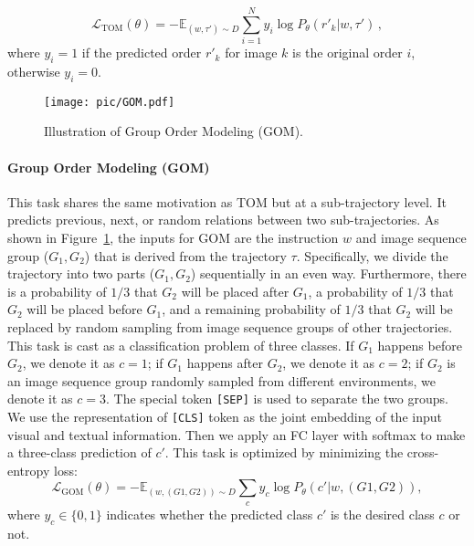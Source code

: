 \documentclass[10pt,twocolumn,letterpaper]{article}
\begin{document}
\vspace{-5pt}
\begin{equation}
    \mathcal{L}_{\text{TOM}}(\theta) = -\mathbb{E}_{({w}, {\tau}')\sim D} \sum_{i=1}^{N}y_i\log P_{\theta}(r'_k | {w}, {\tau}')\,,
\end{equation}
where $y_{i}=1$ if the predicted order $r'_k$ for image $k$ is the original order $i$, otherwise $y_{i}=0$.

\begin{figure}[!t]
	\begin{center}
		\texttt{[image: pic/GOM.pdf]}
	\end{center}
	\vspace{-13pt}
	\caption{Illustration of Group Order Modeling (GOM).
	}
	\label{fig:NVP}
	\vspace{-13pt}
\end{figure}

\vspace{-8pt}
\paragraph{Group Order Modeling (GOM)} 
This task shares the same motivation as TOM but at a sub-trajectory level. It  predicts previous, next, or random relations between two sub-trajectories. 
As shown in Figure~\ref{fig:NVP}, the inputs for GOM are the instruction $w$ and image sequence group ($G_1, G_2$) that is derived from the trajectory ${\tau}$. 
Specifically, we divide the trajectory into two parts ($G_1, G_2$) sequentially in an even way.
Furthermore, there is a probability of $1/3$ that $G_2$ will be placed after $G_1$,  a probability of $1/3$ that $G_2$ will be placed before $G_1$, and a remaining  probability of $1/3$ that $G_2$ will be replaced by random sampling from image sequence groups of other trajectories. 
This task is cast as a classification problem of three classes.
If $G_1$ happens before $G_2$, we denote it as $c=1$; if $G_1$ happens after $G_2$, we denote it as $c=2$; if $G_2$ is an image sequence group randomly sampled from different environments, we denote it as $c=3$. 
The special token \texttt{[SEP]} is used to separate the two groups.
We use the representation of \texttt{[CLS]} token as the joint embedding of the input visual and textual information. Then we apply an FC layer with softmax  to make a three-class prediction of $c'$. This task is optimized by minimizing the cross-entropy loss:
{\small
\begin{equation}
    \mathcal{L}_{\text{GOM}}(\theta) = -\mathbb{E}_{({w}, {(G1,G2)})\sim D} \sum_{c}y_c\log P_{\theta}(c'| {w}, {(G1,G2)}),
\end{equation}
}where $y_c\in \{0, 1\}$ indicates whether the predicted class $c'$ is the desired class $c$ or not.
\end{document}
